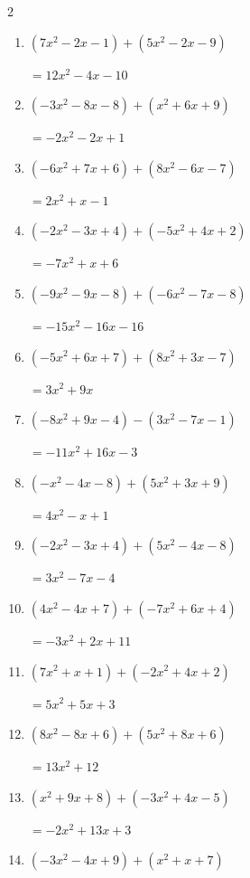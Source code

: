 \begin{multicols}{2}
\begin{enumerate}
        $=-7x^{2}+4x-2$

  \item $(7x^{2}-2x-1)+(5x^{2}-2x-9)$

        $=12x^{2}-4x-10$

  \item $(-3x^{2}-8x-8)+(x^{2}+6x+9)$

        $=-2x^{2}-2x+1$

  \item $(-6x^{2}+7x+6)+(8x^{2}-6x-7)$

        $=2x^{2}+x-1$

  \item $(-2x^{2}-3x+4)+(-5x^{2}+4x+2)$

        $=-7x^{2}+x+6$

  \item $(-9x^{2}-9x-8)+(-6x^{2}-7x-8)$

        $=-15x^{2}-16x-16$

  \item $(-5x^{2}+6x+7)+(8x^{2}+3x-7)$

        $=3x^{2}+9x$

  \item $(-8x^{2}+9x-4)-(3x^{2}-7x-1)$

        $=-11x^{2}+16x-3$

  \item $(-x^{2}-4x-8)+(5x^{2}+3x+9)$

        $=4x^{2}-x+1$

  \item $(-2x^{2}-3x+4)+(5x^{2}-4x-8)$

        $=3x^{2}-7x-4$

  \item $(4x^{2}-4x+7)+(-7x^{2}+6x+4)$

        $=-3x^{2}+2x+11$

\columnbreak %

\resetques

  \item $(7x^{2}+x+1)+(-2x^{2}+4x+2)$

        $=5x^{2}+5x+3$

  \item $(8x^{2}-8x+6)+(5x^{2}+8x+6)$

        $=13x^{2}+12$

  \item $(x^{2}+9x+8)+(-3x^{2}+4x-5)$

        $=-2x^{2}+13x+3$

  \item $(-3x^{2}-4x+9)+(x^{2}+x+7)$


\end{enumerate}
\end{multicols}
